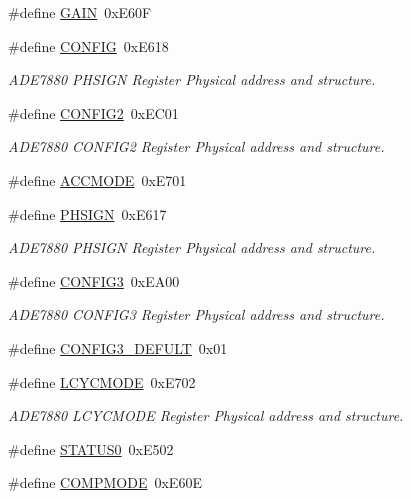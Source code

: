 \begin{DoxyCompactItemize}
\#define \hyperlink{a00036_a8c8f27b35dfa40ccf31c1ee31479a31c}{G\-A\-I\-N}~0x\-E60\-F
\item 
\#define \hyperlink{a00036_a76ea3cf49247a07c54b3db005a3c7f57}{C\-O\-N\-F\-I\-G}~0x\-E618
\begin{DoxyCompactList}\small\item\em A\-D\-E7880 P\-H\-S\-I\-G\-N Register Physical address and structure. \end{DoxyCompactList}\item 
\#define \hyperlink{a00036_a9989dac1034e36497f2f4f81613cab88}{C\-O\-N\-F\-I\-G2}~0x\-E\-C01
\begin{DoxyCompactList}\small\item\em A\-D\-E7880 C\-O\-N\-F\-I\-G2 Register Physical address and structure. \end{DoxyCompactList}\item 
\#define \hyperlink{a00036_a4d776321852a1cf7238c55e708e07459}{A\-C\-C\-M\-O\-D\-E}~0x\-E701
\item 
\#define \hyperlink{a00036_a0d8bb1933bd9e9967444329b9f43d89c}{P\-H\-S\-I\-G\-N}~0x\-E617
\begin{DoxyCompactList}\small\item\em A\-D\-E7880 P\-H\-S\-I\-G\-N Register Physical address and structure. \end{DoxyCompactList}\item 
\#define \hyperlink{a00036_a8d128687074c874210b0c9dada3d8ca7}{C\-O\-N\-F\-I\-G3}~0x\-E\-A00
\begin{DoxyCompactList}\small\item\em A\-D\-E7880 C\-O\-N\-F\-I\-G3 Register Physical address and structure. \end{DoxyCompactList}\item 
\#define \hyperlink{a00036_a6d4592c2f28292b11885fa8ec3ed0941}{C\-O\-N\-F\-I\-G3\-\_\-\-D\-E\-F\-U\-L\-T}~0x01
\item 
\#define \hyperlink{a00036_ad9e1efd6f7feec870444af831015a682}{L\-C\-Y\-C\-M\-O\-D\-E}~0x\-E702
\begin{DoxyCompactList}\small\item\em A\-D\-E7880 L\-C\-Y\-C\-M\-O\-D\-E Register Physical address and structure. \end{DoxyCompactList}\item 
\#define \hyperlink{a00036_aaf584f70289e5fd799fef97c85bb97ee}{S\-T\-A\-T\-U\-S0}~0x\-E502
\item 
\#define \hyperlink{a00036_a31c8d51fdc4d8181e8a66b9d4be2dd8c}{C\-O\-M\-P\-M\-O\-D\-E}~0x\-E60\-E

\end{DoxyCompactItemize}
